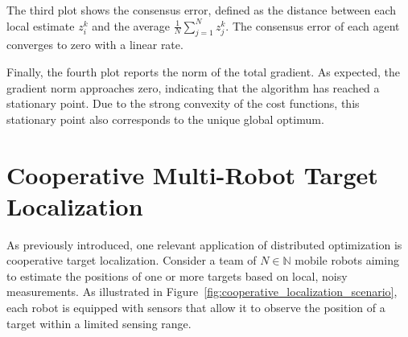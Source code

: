 The third plot shows the consensus error, defined as the distance between each local estimate $z_i^k$ and the average $\frac{1}{N} \sum_{j=1}^N z_j^k$. The consensus error of each agent converges to zero with a linear rate.

Finally, the fourth plot reports the norm of the total gradient. As expected, the gradient norm approaches zero, indicating that the algorithm has reached a stationary point. Due to the strong convexity of the cost functions, this stationary point also corresponds to the unique global optimum.



\section{Cooperative Multi-Robot Target Localization}
As previously introduced, one relevant application of distributed optimization is cooperative target localization. Consider a team of $N \in \mathbb{N}$ mobile robots aiming to estimate the positions of one or more targets based on local, noisy measurements. As illustrated in Figure~\ref{fig:cooperative_localization_scenario}, each robot is equipped with sensors that allow it to observe the position of a target within a limited sensing range.

